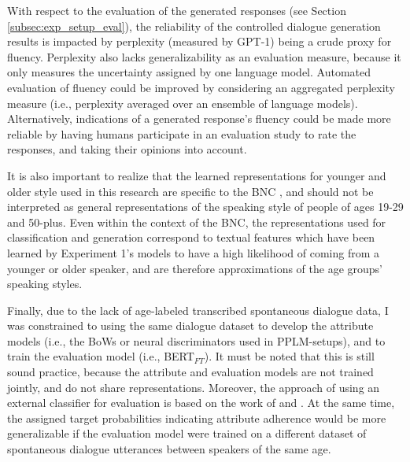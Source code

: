 
With respect to the evaluation of the generated responses (see Section \ref{subsec:exp_setup_eval}), the reliability of the controlled dialogue generation results is impacted by perplexity (measured by GPT-1) being a crude proxy for fluency. Perplexity also lacks generalizability as an evaluation measure, because it only measures the uncertainty assigned by one language model. Automated evaluation of fluency could be improved by considering an aggregated perplexity measure (i.e., perplexity averaged over an ensemble of language models). Alternatively, indications of a generated response's fluency could be made more reliable by having humans participate in an evaluation study to rate the responses, and taking their opinions into account. 

It is also important to realize that the learned representations for younger and older style used in this research are specific to the BNC \citep{love-spoken-bnc-2014}, and should not be interpreted as general representations of the speaking style of people of ages 19-29 and 50-plus. Even within the context of the BNC, the representations used for classification and generation 
correspond to textual features which have been learned by Experiment 1's models to have a high likelihood of coming from a younger or older speaker, 
and are therefore approximations of the age groups' speaking styles. 

Finally, due to the lack of age-labeled transcribed spontaneous dialogue data, I was constrained to using the same dialogue dataset to develop the attribute models (i.e., the BoWs or neural discriminators used in PPLM-setups), and to train the evaluation model (i.e., BERT$_{FT}$). It must be noted that this is still sound practice, because the attribute and evaluation models are not trained jointly, and do not share representations. Moreover, the approach of using an external classifier for evaluation is based on the work of \cite{dathathri2019plug} and \cite{madotto-etal-2020-plug}. At the same time, the assigned target probabilities indicating attribute adherence would be more generalizable if the evaluation model were trained on a different dataset of spontaneous dialogue utterances between speakers of the same age.



